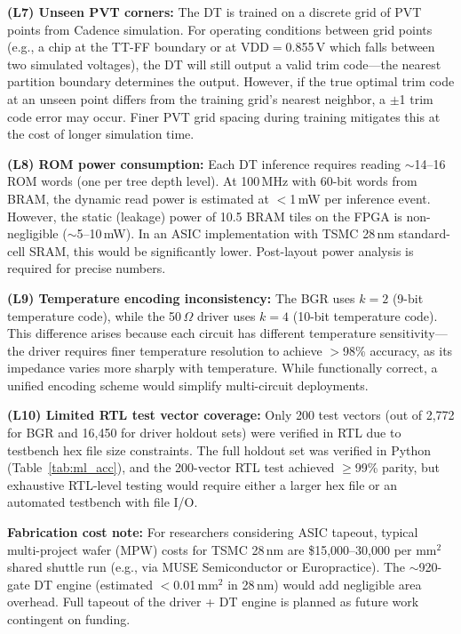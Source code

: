 \documentclass[lettersize,journal]{IEEEtran}
\begin{document}
\textbf{(L7) Unseen PVT corners:} The DT is trained on a discrete grid of PVT points from Cadence simulation. For operating conditions between grid points (e.g., a chip at the TT-FF boundary or at VDD$=$0.855\,V which falls between two simulated voltages), the DT will still output a valid trim code---the nearest partition boundary determines the output. However, if the true optimal trim code at an unseen point differs from the training grid's nearest neighbor, a $\pm$1 trim code error may occur. Finer PVT grid spacing during training mitigates this at the cost of longer simulation time.

\textbf{(L8) ROM power consumption:} Each DT inference requires reading $\sim$14--16 ROM words (one per tree depth level). At 100\,MHz with 60-bit words from BRAM, the dynamic read power is estimated at $<$1\,mW per inference event. However, the static (leakage) power of 10.5 BRAM tiles on the FPGA is non-negligible ($\sim$5--10\,mW). In an ASIC implementation with TSMC 28\,nm standard-cell SRAM, this would be significantly lower. Post-layout power analysis is required for precise numbers.

\textbf{(L9) Temperature encoding inconsistency:} The BGR uses $k=2$ (9-bit temperature code), while the 50\,$\Omega$ driver uses $k=4$ (10-bit temperature code). This difference arises because each circuit has different temperature sensitivity---the driver requires finer temperature resolution to achieve $>$98\% accuracy, as its impedance varies more sharply with temperature. While functionally correct, a unified encoding scheme would simplify multi-circuit deployments.

\textbf{(L10) Limited RTL test vector coverage:} Only 200 test vectors (out of 2,772 for BGR and 16,450 for driver holdout sets) were verified in RTL due to testbench hex file size constraints. The full holdout set was verified in Python (Table~\ref{tab:ml_acc}), and the 200-vector RTL test achieved $\geq$99\% parity, but exhaustive RTL-level testing would require either a larger hex file or an automated testbench with file I/O.

\textbf{Fabrication cost note:} For researchers considering ASIC tapeout, typical multi-project wafer (MPW) costs for TSMC 28\,nm are \$15,000--30,000 per mm$^{2}$ shared shuttle run (e.g., via MUSE Semiconductor or Europractice). The $\sim$920-gate DT engine (estimated $<$0.01\,mm$^{2}$ in 28\,nm) would add negligible area overhead. Full tapeout of the driver + DT engine is planned as future work contingent on funding.
\end{document}
